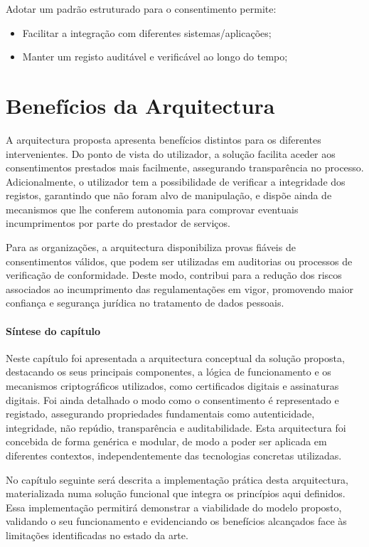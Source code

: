 Adotar um padrão estruturado para o consentimento permite:
\begin{itemize}
    \item Facilitar a integração com diferentes sistemas/aplicações;
    \item Manter um registo auditável e verificável ao longo do tempo;
\end{itemize}

\section{Benefícios da Arquitectura}

A arquitectura proposta apresenta benefícios distintos para os diferentes intervenientes.
Do ponto de vista do utilizador, a solução facilita aceder aos consentimentos prestados mais facilmente, assegurando transparência no processo.  
Adicionalmente, o utilizador tem a possibilidade de verificar a integridade dos registos, garantindo que não foram alvo de manipulação, e dispõe ainda de mecanismos que lhe conferem autonomia para comprovar eventuais incumprimentos por parte do prestador de serviços.

Para as organizações, a arquitectura disponibiliza provas fiáveis de consentimentos válidos, que podem ser utilizadas em auditorias ou processos de verificação de conformidade.
Deste modo, contribui para a redução dos riscos associados ao incumprimento das regulamentações em vigor, promovendo maior confiança e segurança jurídica no tratamento de dados pessoais.

\paragraph*{Síntese do capítulo}

Neste capítulo foi apresentada a arquitectura conceptual da solução proposta, destacando os seus principais componentes, a lógica de funcionamento e os mecanismos criptográficos utilizados, como certificados digitais e assinaturas digitais. Foi ainda detalhado o modo como o consentimento é representado e registado, assegurando propriedades fundamentais como autenticidade, integridade, não repúdio, transparência e auditabilidade. Esta arquitectura foi concebida de forma genérica e modular, de modo a poder ser aplicada em diferentes contextos, independentemente das tecnologias concretas utilizadas.

No capítulo seguinte será descrita a implementação prática desta arquitectura, materializada numa solução funcional que integra os princípios aqui definidos. Essa implementação permitirá demonstrar a viabilidade do modelo proposto, validando o seu funcionamento e evidenciando os benefícios alcançados face às limitações identificadas no estado da arte.
